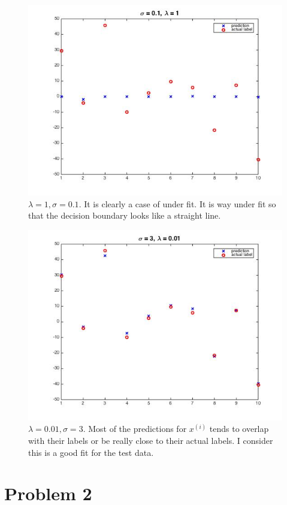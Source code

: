 \documentclass[twoside]{article}
\theoremstyle{definition}
\theoremstyle{definition}
\theoremstyle{remark}
\begin{document}
\begin{figure}[H]
\centering
\includegraphics[width=120mm]{problem1Pic5.jpg}
\caption{ $\lambda =1, \sigma = 0.1$.  It is clearly a case of under fit. It is way under fit so that the decision boundary looks like a straight line.  \label{problem1Pic2}}
\end{figure}

\begin{figure}[H]
\centering
\includegraphics[width=120mm]{problem1Pic6.jpg}
\caption{ $\lambda =0.01, \sigma = 3$.  Most of the predictions for $x^{(i)}$ tends to overlap with their labels or be really close to their actual labels. I consider this is a good fit for the test data. \label{problem1Pic2}}
\end{figure}

\section{Problem 2}
\end{document}
